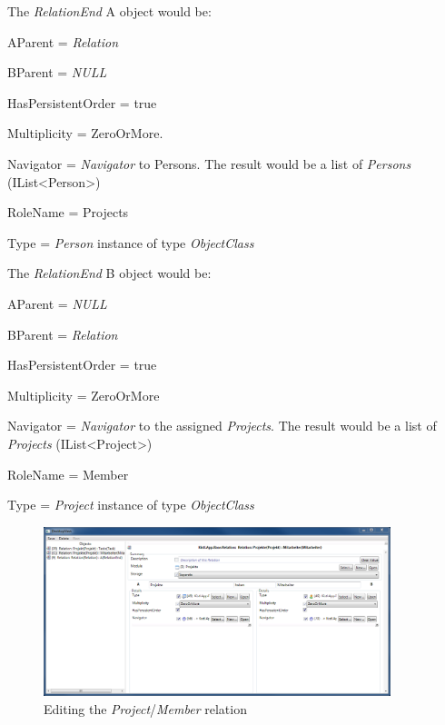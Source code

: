 The \emph{RelationEnd} A object would be:
\begin{descriptionBorder}
	\item[AParent] { = \emph{Relation}  }
	\item[BParent] { = \emph{NULL} }
	\item[HasPersistentOrder] { = true  }
	\item[Multiplicity] { = ZeroOrMore. }
	\item[Navigator] { = \emph{Navigator} to Persons. The result would be a list of \emph{Persons} (IList\textless Person\textgreater) }
	\item[RoleName] { = Projects }
	\item[Type] { = \emph{Person} instance of type \emph{ObjectClass} }
\end{descriptionBorder}

The \emph{RelationEnd} B object would be:
\begin{descriptionBorder}
	\item[AParent] { =  \emph{NULL} }
	\item[BParent] { = \emph{Relation} }
	\item[HasPersistentOrder] { = true  }
	\item[Multiplicity] { = ZeroOrMore }
	\item[Navigator] { = \emph{Navigator} to the assigned \emph{Projects}. The result would be a list of \emph{Projects} (IList\textless Project\textgreater)  }
	\item[RoleName] { = Member }
	\item[Type] { = \emph{Project} instance of type \emph{ObjectClass} }
\end{descriptionBorder}

\begin{figure}[ht]
	\begin{center}
		\includegraphics[width=0.9\textwidth]{images/ScreenShot_Rel_Project_ProjectMember.png}
		\caption{Editing the \emph{Project}/\emph{Member} relation}
		\label{editing_project_member_relation}
	\end{center}
\end{figure}

